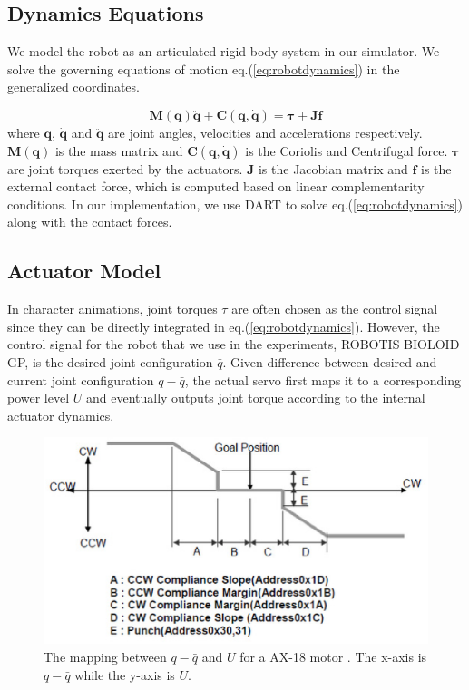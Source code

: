 \subsection{Dynamics Equations}

We model the robot as an articulated rigid body system in our simulator. We solve the governing equations of motion eq.(\ref{eq:robotdynamics}) in the generalized coordinates.

\begin{equation}
\label{eq:robotdynamics}
\mathbf{M}(\mathbf{q})\mathbf{\ddot{q}}+\mathbf{C}(\mathbf{q},\mathbf{\dot{q}})=\mathbf{\tau}+\mathbf{Jf}
\end{equation}
where $\mathbf{q}$, $\mathbf{\dot{q}}$ and $\mathbf{\ddot{q}}$ are joint angles, velocities and accelerations respectively. $\mathbf{M}(\mathbf{q})$ is the mass matrix and $\mathbf{C}(\mathbf{q},\mathbf{\dot{q}})$ is the Coriolis and Centrifugal force. $\mathbf{\tau}$ are joint torques exerted by the actuators. $\mathbf{J}$ is the Jacobian matrix and $\mathbf{f}$ is the external contact force, which is computed based on linear complementarity conditions. In our implementation, we use DART to solve eq.(\ref{eq:robotdynamics}) along with the contact forces.

\subsection{Actuator Model}

In character animations, joint torques $\tau$ are often chosen as the control signal since they can be directly integrated in eq.(\ref{eq:robotdynamics}). However, the control signal for the robot that we use in the experiments, ROBOTIS BIOLOID GP, is the desired joint configuration $\bar{q}$. Given difference between desired and current joint configuration ${q-\bar{q}}$, the actual servo first maps it to a corresponding power level $U$ and eventually outputs joint torque according to the internal actuator dynamics.

\begin{figure}[t]
\centering
\includegraphics[width=5in]{figures/ax18gain.eps}
\caption{The mapping between $q-\bar{q}$ and $U$ for a AX-18 motor \cite{}. The x-axis is $q-\bar{q}$ while the y-axis is $U$.}
\label{fig:actuatorMap}
\end{figure}


